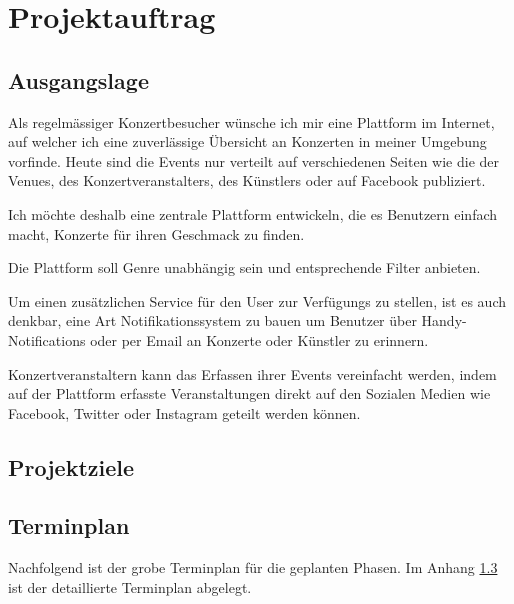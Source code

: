 \chapter{Projektauftrag}

\label{AppendixProjektauftrag}

\section{Ausgangslage}\label{ausgangslage}

Als regelmässiger Konzertbesucher wünsche ich mir eine Plattform im
Internet, auf welcher ich eine zuverlässige Übersicht an Konzerten in
meiner Umgebung vorfinde. Heute sind die Events nur verteilt auf
verschiedenen Seiten wie die der Venues, des Konzertveranstalters, des
Künstlers oder auf Facebook publiziert.

Ich möchte deshalb eine zentrale Plattform entwickeln, die es Benutzern
einfach macht, Konzerte für ihren Geschmack zu finden.

Die Plattform soll Genre unabhängig sein und entsprechende Filter
anbieten.

Um einen zusätzlichen Service für den User zur Verfügungs zu stellen,
ist es auch denkbar, eine Art Notifikationssystem zu bauen um Benutzer
über Handy-Notifications oder per Email an Konzerte oder Künstler zu
erinnern.

Konzertveranstaltern kann das Erfassen ihrer Events vereinfacht werden,
indem auf der Plattform erfasste Veranstaltungen direkt auf den Sozialen
Medien wie Facebook, Twitter oder Instagram geteilt werden können.

\clearpage
\section{Projektziele}\label{projektziele}




\section{Terminplan}\label{terminplan}

Nachfolgend ist der grobe Terminplan für die geplanten Phasen. Im Anhang \ref{terminplan} ist
der detaillierte Terminplan abgelegt.

